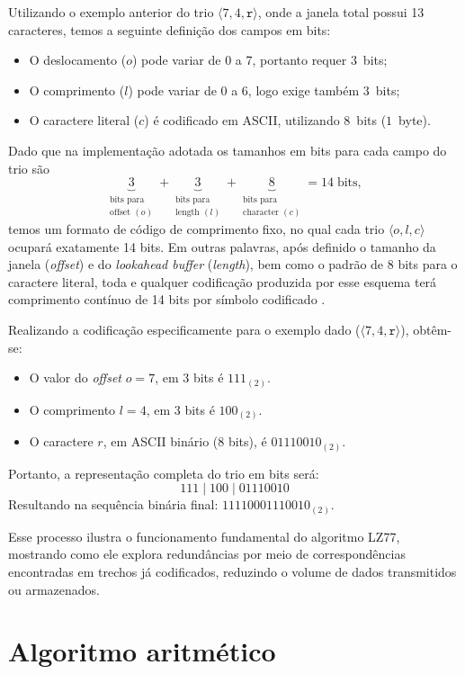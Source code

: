 Utilizando o exemplo anterior do trio $\langle 7, 4, \texttt{r} \rangle$, onde a janela total possui 13 caracteres, temos a seguinte definição dos campos em bits:
\begin{itemize}
  \item O deslocamento ($o$) pode variar de 0 a 7, portanto requer $3$~bits;
  \item  O comprimento ($l$) pode variar de 0 a 6, logo exige também $3$~bits;
  \item O caractere literal ($c$) é codificado em ASCII, utilizando $8$~bits ($1$~byte).
\end{itemize}
Dado que na implementação adotada os tamanhos em bits para cada campo do trio são
\[
\underbrace{3}_{\substack{\text{bits para}\\\text{offset }(o)}} + 
\underbrace{3}_{\substack{\text{bits para}\\\text{length }(l)}} + 
\underbrace{8}_{\substack{\text{bits para}\\\text{character }(c)}} 
= 14\;\text{bits},
\]
temos um formato de código de comprimento fixo, no qual cada trio $\langle o, l, c\rangle$ ocupará exatamente 14 bits. Em outras palavras, após definido o tamanho da janela (\textit{offset}) e do \textit{lookahead buffer} (\textit{length}), bem como o padrão de 8 bits para o caractere literal, toda e qualquer codificação produzida por esse esquema terá comprimento contínuo de 14 bits por símbolo codificado \cite{nelson2008data}.

Realizando a codificação especificamente para o exemplo dado ($\langle 7, 4, \texttt{r} \rangle$), obtêm-se:
\begin{itemize}
  \item O valor do \textit{offset} $o = 7$, em $3$ bits é $111_{(2)}$.
  \item O comprimento $l = 4$, em $3$ bits é $100_{(2)}$.
  \item O caractere $r$, em ASCII binário ($8$ bits), é $01110010_{(2)}$.
\end{itemize}
Portanto, a representação completa do trio em bits será:
$$
111 \;|\; 100 \;|\; 01110010
$$
Resultando na sequência binária final: $11110001110010_{(2)}$.

Esse processo ilustra o funcionamento fundamental do algoritmo LZ77, mostrando como ele explora redundâncias por meio de correspondências encontradas em trechos já codificados, reduzindo o volume de dados transmitidos ou armazenados.

\section{Algoritmo aritmético}\label{Algoritmo aritmético}

